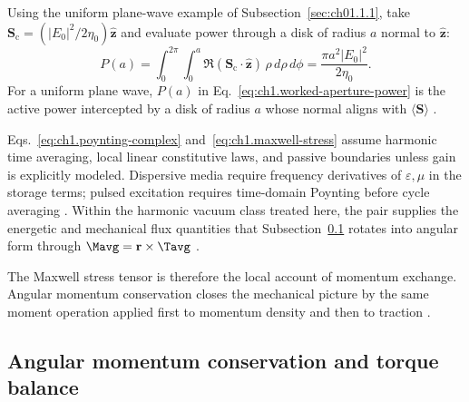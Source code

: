 Using the uniform plane-wave example of Subsection~\ref{sec:ch01.1.1}, take $\mathbf{S}_\mathrm{c}=(|E_0|^2/2\eta_0)\hat{\mathbf{z}}$
and evaluate power through a disk of radius $a$ normal to $\hat{\mathbf{z}}$:
\begin{equation}
\label{eq:ch1.worked-aperture-power}
P(a)=\int_0^{2\pi}\!\!\int_0^a \Re(\mathbf{S}_\mathrm{c}\cdot\hat{\mathbf{z}})\,\rho\,d\rho\,d\phi
=\frac{\pi a^2 |E_0|^2}{2\eta_0}.
\end{equation}
For a uniform plane wave, $P(a)$ in Eq.~\eqref{eq:ch1.worked-aperture-power} is the active power intercepted by a disk of radius $a$ whose normal aligns with $\langle\mathbf{S}\rangle$ \cite{poynting1884}.

Eqs.~\eqref{eq:ch1.poynting-complex} and~\eqref{eq:ch1.maxwell-stress} assume
harmonic time averaging, local linear constitutive laws, and passive boundaries
unless gain is explicitly modeled. Dispersive media require frequency derivatives of
\(\varepsilon,\mu\) in the storage terms; pulsed excitation requires time-domain
Poynting before cycle averaging \cite{stratton1941}.
Within the harmonic vacuum class treated here, the pair supplies the energetic and
mechanical flux quantities that Subsection~\ref{sec:ch01.1.5} rotates into angular
form through $\Mavg=\mathbf{r}\times\Tavg$ \cite{minkowski1908}.

The Maxwell stress tensor is therefore the local account of momentum exchange. Angular momentum conservation closes the mechanical picture by the same moment operation applied first to momentum density and then to traction \cite{stratton1941,poynting1884}.
\subsection{Angular momentum conservation and torque balance}
\label{sec:ch01.1.5}

